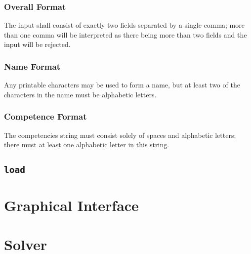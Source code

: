 \documentclass[a4paper, 11pt]{article}
\begin{document}
\subsubsection{Overall Format}

The input shall consist of exactly two fields separated by a single comma; more than one comma will be interpreted as there being more than two fields and the input will be rejected.

\subsubsection{Name Format}

Any printable characters may be used to form a name, but at least two of the characters in the name must be alphabetic letters.

\subsubsection{Competence Format}

The competencies string must consist solely of spaces and alphabetic letters; there must at least one alphabetic letter in this string.

\subsection{\texttt{load}}

\section{Graphical Interface}

\section{Solver}
\end{document}
